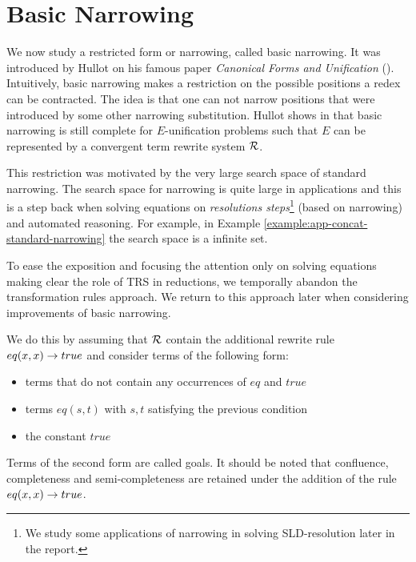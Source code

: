 \section{Basic Narrowing}
We now study a restricted form or narrowing, called basic narrowing. It was introduced by Hullot on his famous paper \textit{Canonical Forms and Unification} (\cite{hullot:cfunif}). Intuitively, basic narrowing makes a restriction on the possible positions a redex can be contracted. The idea is that one can not narrow positions that were introduced by some other narrowing substitution. Hullot shows in \cite{hullot:cfunif} that basic narrowing is still complete for $E$-unification problems such that $E$ can be represented by a convergent term rewrite system $\mathcal{R}$.

This restriction was motivated by the very large search space of standard narrowing. The search space for narrowing is quite large in applications and this is a step back when solving equations on \textit{resolutions steps}\footnote{We study some applications of narrowing in solving SLD-resolution later in the report.} (based on narrowing) and automated reasoning. For example, in Example \ref{example:app-concat-standard-narrowing} the search space is a infinite set.

To ease the exposition and focusing the attention only on solving equations making clear the role of TRS in reductions, we temporally abandon the transformation rules approach. We return to this approach later when considering improvements of basic narrowing.

We do this by assuming that $\mathcal{R}$ contain the additional rewrite rule $eq(x,x) \rightarrow true$ and consider terms of the following form:
\begin{itemize}
	\item terms that do not contain any occurrences of $eq$ and $true$
	\item terms $eq(s,t)$ with $s,t$ satisfying the previous condition
	\item the constant $true$
\end{itemize}
Terms of the second form are called goals. It should be noted that confluence, completeness and semi-completeness are retained under the addition of the rule $eq(x,x) \rightarrow true$.

